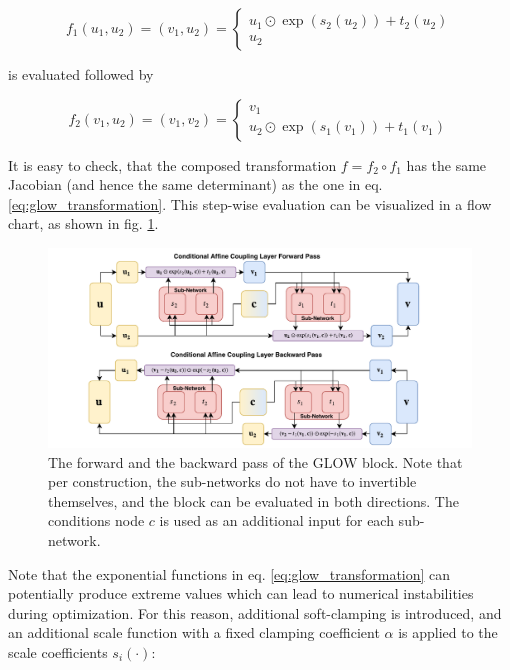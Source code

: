\begin{equation*}
	f_1(u_1, u_2) = (v_1, u_2) = \begin{cases}
		u_1 \odot \exp(s_2(u_2)) + t_2(u_2) \\
		u_2
	\end{cases}
\end{equation*}

is evaluated followed by

\begin{equation*}
	f_2(v_1, u_2) = (v_1, v_2) = \begin{cases}
		v_1 \\
		 u_2 \odot \exp(s_1(v_1)) + t_1(v_1)
	\end{cases}
\end{equation*}

It is easy to check, that the composed transformation $f = f_2 \circ f_1$ has the same Jacobian (and hence the same determinant) as the one in eq. \ref{eq:glow_transformation}. This step-wise evaluation can be visualized in a flow chart, as shown in fig. \ref{fig:glow}.

\begin{figure}[h!]
	\centering
	\includegraphics[width=\linewidth]{figures/neural_networks/glow.pdf}
	\caption{The forward and the backward pass of the GLOW block. Note that per construction, the sub-networks do not have to invertible themselves, and the block can be evaluated in both directions. The conditions node $c$ is used as an additional input for each sub-network. \cite{Ksoll_2020}}
	\label{fig:glow}
\end{figure}

Note that the exponential functions in eq. \ref{eq:glow_transformation} can potentially produce extreme values which can lead to numerical instabilities during optimization. For this reason, additional soft-clamping is introduced, and an additional scale function with a fixed clamping coefficient $\alpha$ is applied to the scale coefficients $s_i(\cdot)$:

